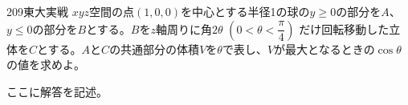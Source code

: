 \begin{prob}{209}{}{東大実戦}
 $xyz$空間の点$(1,0,0)$を中心とする半径1の球の$y\ge 0$の部分を$A$、$y\le 0$の部分を$B$とする。$B$を$z$軸周りに角$2\theta$ $(0<\theta<\dfrac{\pi}{4})$ だけ回転移動した立体を$C$とする。$A$と$C$の共通部分の体積$V$を$\theta$で表し、$V$が最大となるときの$\cos\theta$の値を求めよ。
\end{prob}
ここに解答を記述。